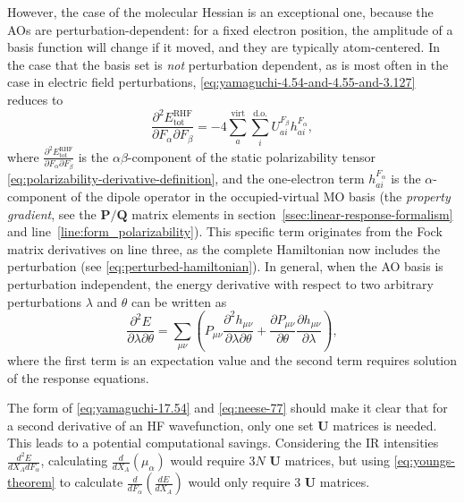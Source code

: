 \documentclass[%
class = book,%
crop = false,%
float = true,%
multi = true,%
preview = false,%
]{standalone}
\begin{document}
However, the case of the molecular Hessian is an exceptional one, because the AOs are perturbation-dependent: for a fixed electron position, the amplitude of a basis function will change if it moved, and they are typically atom-centered. In the case that the basis set is \textit{not} perturbation dependent, as is most often in the case in electric field perturbations, \eqref{eq:yamaguchi-4.54-and-4.55-and-3.127} reduces to
\begin{equation}
  \label{eq:yamaguchi-17.54} \tag{Yamaguchi eq. 17.54}
  \frac{\partial^{2} E_{\text{tot}}^{\text{RHF}}}{\partial F_{\alpha} \partial F_{\beta}} = -4 \sum_{a}^{\text{virt}} \sum_{i}^{\text{d.o.}} U_{ai}^{F_{\beta}} h_{ai}^{F_{\alpha}},
\end{equation}
where \(\frac{\partial^{2} E_{\text{tot}}^{\text{RHF}}}{\partial F_{\alpha} \partial F_{\beta}}\) is the \(\alpha\beta\)-component of the static polarizability tensor \eqref{eq:polarizability-derivative-definition}, and the one-electron term \(h_{ai}^{F_{\alpha}}\) is the \(\alpha\)-component of the dipole operator in the occupied-virtual MO basis (the \emph{property gradient}, see the \(\mathbf{P}/\mathbf{Q}\) matrix elements in section~\ref{ssec:linear-response-formalism} and line~\ref{line:form_polarizability}). This specific term originates from the Fock matrix derivatives on line three, as the complete Hamiltonian now includes the perturbation (see \eqref{eq:perturbed-hamiltonian}). In general, when the AO basis is perturbation independent, the energy derivative with respect to two arbitrary perturbations \(\lambda\) and \(\theta\) can be written as
\begin{equation}
  \label{eq:neese-77} \tag{Neese eq. 77}
  \frac{\partial^{2} E}{\partial \lambda \partial \theta} = \sum_{\mu\nu} \left( P_{\mu\nu} \frac{\partial^{2} h_{\mu\nu}}{\partial \lambda \partial \theta} + \frac{\partial P_{\mu\nu}}{\partial \theta} \frac{\partial h_{\mu\nu}}{\partial \lambda} \right),
\end{equation}
where the first term is an expectation value and the second term requires solution of the response equations.

The form of \eqref{eq:yamaguchi-17.54} and \eqref{eq:neese-77} should make it clear that for a second derivative of an HF wavefunction, only one set \(\mathbf{U}\) matrices is needed. This leads to a potential computational savings. Considering the IR intensities \(\frac{d^{2}E}{dX_{A}dF_{\alpha}}\), calculating \(\frac{d}{d X_{A}} \left(\mu_{\alpha}\right)\) would require \(3N\) \(\mathbf{U}\) matrices, but using \eqref{eq:youngs-theorem} to calculate \(\frac{d}{d F_{\alpha}} \left(\frac{d E}{d X_{A}}\right)\) would only require \(3\) \(\mathbf{U}\) matrices.
\end{document}
